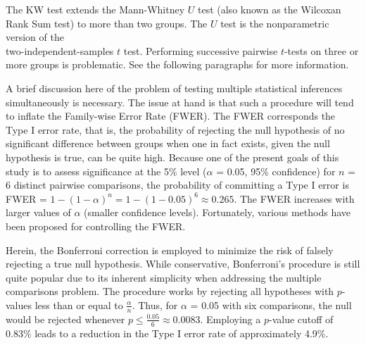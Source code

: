 The KW test extends the Mann-Whitney $U$ test (also known as the Wilcoxan Rank Sum test) to more than two groups. The $U$ test is the nonparametric version of the \\ two-independent-samples $t$ test. Performing successive pairwise $t$-tests on three or more groups is problematic. See the following paragraphs for more information. 



A brief discussion here of the problem of testing multiple statistical inferences \\ simultaneously is necessary. The issue at hand is that such a procedure will tend to inflate the Family-wise Error Rate (FWER). The FWER corresponds the Type I error rate, that is, the probability of rejecting the null hypothesis of no significant difference between groups when one in fact exists, given the null hypothesis is true, can be quite high. Because one of the present goals of this study is to assess significance at the 5\% level ($\alpha$ = 0.05, 95\% confidence) for $n$ = 6 distinct pairwise comparisons, the probability of committing a Type I error is FWER = $1 - (1 - \alpha)^n = 1 - (1-0.05)^6 \approx 0.265$. The FWER increases with larger values of $\alpha$ (smaller confidence levels). Fortunately, various methods have been proposed for controlling the FWER.

Herein, the Bonferroni correction is employed to minimize the risk of falsely rejecting a true null hypothesis. While conservative, Bonferroni's procedure is still quite popular due to its inherent simplicity when addressing the multiple comparisons problem. The procedure works by rejecting all hypotheses with $p$-values less than or equal to $\frac{\alpha}{n}$. Thus, for $\alpha$ = 0.05 with six comparisons, the null would be rejected whenever $p \leq \frac{0.05}{6} \approx 0.0083$. Employing a $p$-value cutoff of 0.83\% leads to a reduction in the Type I error rate of approximately 4.9\%.



